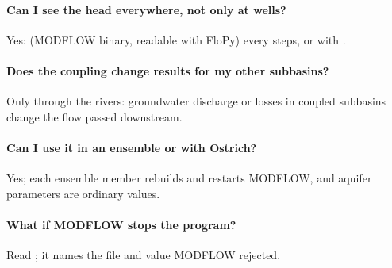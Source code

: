 \paragraph{Can I see the head everywhere, not only at wells?} Yes:  (MODFLOW binary, readable with FloPy)
every  steps, or  with .
\paragraph{Does the coupling change results for my other subbasins?} Only through the rivers: groundwater discharge or losses
in coupled subbasins change the flow passed downstream.
\paragraph{Can I use it in an ensemble or with Ostrich?} Yes; each ensemble member rebuilds and restarts MODFLOW, and aquifer
parameters are ordinary  values.
\paragraph{What if MODFLOW stops the program?} Read ; it names the file and value MODFLOW rejected.
